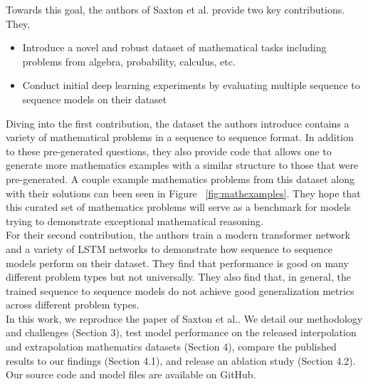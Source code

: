 Towards this goal, the authors of Saxton et al. \supercite{DBLP:journals/corr/abs-1904-01557}  provide two key contributions. They, 

\begin{itemize}
   \item Introduce a novel and robust dataset of mathematical tasks including problems from algebra, probability, calculus, etc.
   \item Conduct initial deep learning experiments by evaluating multiple sequence to sequence models on their dataset 
\end{itemize}

Diving into the first contribution, the dataset the authors introduce contains a variety of mathematical problems in a sequence to sequence format. In addition to these pre-generated questions, they also provide code that allows one to generate more mathematics examples with a similar structure to those that were pre-generated. A couple example mathematics problems from this dataset along with their solutions can been seen in Figure ~\ref{fig:mathexamples}. They hope that this curated set of mathematics problems will serve as a benchmark for models trying to demonstrate exceptional mathematical reasoning.  \\

For their second contribution, the authors train a modern transformer network \supercite{vaswani2017attention} and a variety of LSTM networks \supercite{hochreiter1997long} to demonstrate how sequence to sequence models perform on their dataset. They find that performance is good on many different problem types but not universally. They also find that, in general, the trained sequence to sequence models do not achieve good generalization metrics across different problem types.  \\ 


In this work, we reproduce the paper of Saxton et al.\supercite{DBLP:journals/corr/abs-1904-01557}. We detail our methodology and challenges (Section 3), test model performance on the released interpolation and extrapolation mathematics datasets (Section 4), compare the published results to our findings (Section 4.1),  and release an ablation study (Section 4.2).  Our source code and model files are available on GitHub\supercite{hs-math-nlp}.


